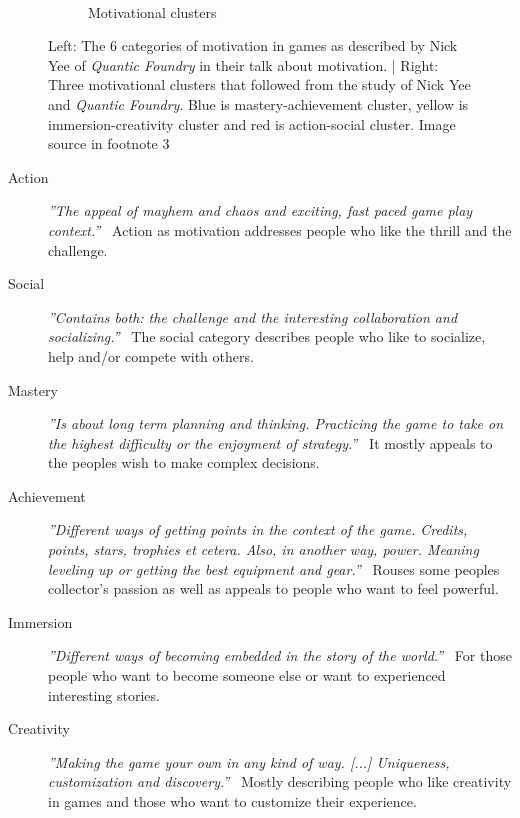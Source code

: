 \begin{figure}
\begin{subfigure}[b]{0.49\columnwidth}
		\caption[motivation]{Motivational clusters}~\label{fig:motivationClusters}
	\end{subfigure}
	\caption[]{Left: The 6 categories of motivation in games as described by Nick Yee of \textit{Quantic Foundry} in their talk about motivation. | Right: Three motivational clusters that followed from the study of Nick Yee and \textit{Quantic Foundry}. Blue is mastery-achievement cluster, yellow is immersion-creativity cluster and red is action-social cluster. Image source in footnote 3\textcolor{white}{\footnotemark[3]}}
\end{figure}


\begin{description}
	\item[Action] \textit{''The appeal of mayhem and chaos and exciting, fast paced game play context.''}~\cite{online:motivation} \newline Action as motivation addresses people who like the thrill and the challenge.
	
	\item[Social] \textit{''Contains both: the challenge and the interesting collaboration and socializing.''}~\cite{online:motivation} \newline The social category describes people who like to socialize, help and/or compete with others.
	
	\item[Mastery] \textit{''Is about long term planning and thinking. Practicing the game to take on the highest difficulty or the enjoyment of strategy.''}~\cite{online:motivation} \newline It mostly appeals to the peoples wish to make complex decisions.
	
	\item[Achievement] \textit{''Different ways of getting points in the context of the game. Credits, points, stars, trophies et cetera. Also, in another way, power. Meaning leveling up or getting the best equipment and gear.''}~\cite{online:motivation} \newline Rouses some peoples collector's passion as well as appeals to people who want to feel powerful.
	
	\item[Immersion] \textit{''Different ways of becoming embedded in the story of the world.''}~\cite{online:motivation} \newline For those people who want to become someone else or want to experienced interesting stories.
	
	\item[Creativity] \textit{''Making the game your own in any kind of way. [...] Uniqueness, customization and discovery.''}~\cite{online:motivation} \newline Mostly describing people who like creativity in games and those who want to customize their experience.

\end{description}

